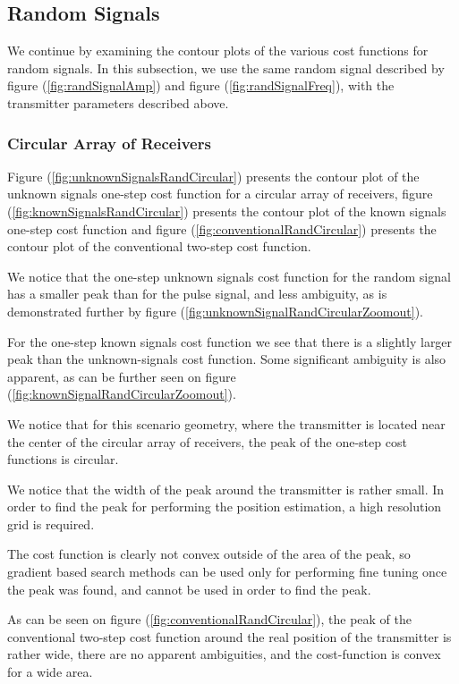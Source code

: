\subsection{Random Signals}
We continue by examining the contour plots of the various cost functions for random signals. In this subsection, we use the same random signal described by figure (\ref{fig:randSignalAmp}) and figure (\ref{fig:randSignalFreq}), with the transmitter parameters described above.

\subsubsection*{Circular Array of Receivers}
Figure (\ref{fig:unknownSignalsRandCircular}) presents the contour plot of the unknown signals one-step cost function for a circular array of receivers, figure (\ref{fig:knownSignalsRandCircular}) presents the contour plot of the known signals one-step cost function and figure (\ref{fig:conventionalRandCircular}) presents the contour plot of the conventional two-step cost function.

We notice that the one-step unknown signals cost function for the random signal has a smaller peak than for the pulse signal, and less ambiguity, as is demonstrated further by figure (\ref{fig:unknownSignalRandCircularZoomout}).

For the one-step known signals cost function we see that there is a slightly larger peak than the unknown-signals cost function. Some significant ambiguity is also apparent, as can be further seen on figure (\ref{fig:knownSignalRandCircularZoomout}).

We notice that for this scenario geometry, where the transmitter is located near the center of the circular array of receivers, the peak of the one-step cost functions is circular. 

We notice that the width of the peak around the transmitter is rather small. In order to find the peak for performing the position estimation, a high resolution grid is required. 

The cost function is clearly not convex outside of the area of the peak, so gradient based search methods can be used only for performing fine tuning once the peak was found, and cannot be used in order to find the peak.

As can be seen on figure (\ref{fig:conventionalRandCircular}), the peak of the conventional two-step cost function around the real position of the transmitter is rather wide, there are no apparent ambiguities, and the cost-function is convex for a wide area. 

